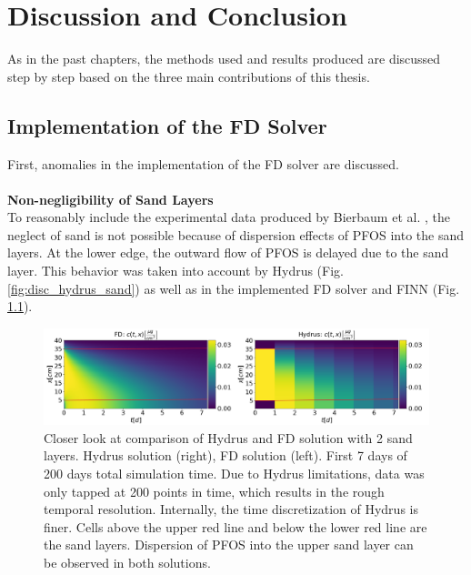 \chapter{Discussion and Conclusion}
As in the past chapters, the methods used and results produced are discussed step by step based on the three main contributions of this thesis.
\section{Implementation of the FD Solver}
First, anomalies in the implementation of the FD solver are discussed.\\
\\
\textbf{Non-negligibility of Sand Layers}
\\
To reasonably include the experimental data produced by Bierbaum et al. \cite{Bierbaum2022Mar}, the neglect of sand is not possible because of dispersion effects of PFOS into the sand layers. At the lower edge, the outward flow of PFOS is delayed due to the sand layer. This behavior was taken into account by Hydrus (Fig. \ref{fig:disc_hydrus_sand}) as well as in the implemented FD solver and FINN (Fig. \ref{fig:disc_ov_hyd_fd_sand_10d}). 
\begin{figure}
	\centering
	\includegraphics[width=\textwidth]{images/disc_ov_hyd_fd_sand_10d.png}
\caption[Closer look at Hydrus and FD solution]{Closer look at comparison of Hydrus and FD solution with 2 sand layers. Hydrus solution (right), FD solution (left). First 7 days of 200 days total simulation time. Due to Hydrus limitations, data was only tapped at 200 points in time, which results in the rough temporal resolution. Internally, the time discretization of Hydrus is finer. Cells above the upper red line and below the lower red line are the sand layers. Dispersion of PFOS into the upper sand layer can be observed in both solutions.}
\label{fig:disc_ov_hyd_fd_sand_10d}
\end{figure}
